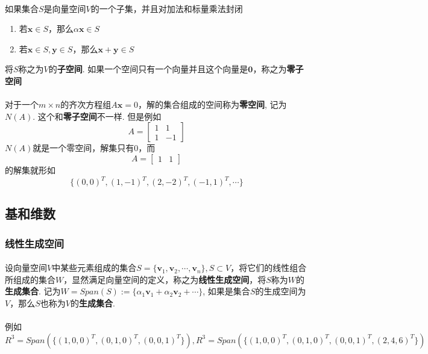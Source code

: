 \paragraph{}
如果集合$S$是向量空间$V$的一个子集，并且对加法和标量乘法封闭
\begin{enumerate}
\item 若$\textbf{x} \in S$，那么$\alpha \textbf{x} \in S$
\item 若$\textbf{x} \in S, \textbf{y} \in S$，那么$\textbf{x} + \textbf{y} \in S$
\end{enumerate}
将$S$称之为$V$的\textbf{子空间}. 如果一个空间只有一个向量并且这个向量是$\textbf{0}$，称之为\textbf{零子空间}

\paragraph{}
对于一个$m\times n$的齐次方程组$A\textbf{x} = 0$，解的集合组成的空间称为\textbf{零空间}, 记为$N(A)$.  这个和\textbf{零子空间}不一样. 但是例如
$$
A = \begin{bmatrix}
    1 & 1 \\
    1 & -1
  \end{bmatrix} 
$$
$N(A)$就是一个零空间，解集只有0，而
$$
A = \begin{bmatrix}
    1 & 1 
  \end{bmatrix} 
$$
的解集就形如
$$
\{(0, 0)^T, (1, -1)^T, (2, -2)^T, (-1, 1)^T, \cdots\}
$$

\subsection{基和维数}

\subsubsection{线性生成空间}
\paragraph{}
设向量空间$V$中某些元素组成的集合$S = \{\textbf{v}_1, \textbf{v}_2, \cdots, \textbf{v}_n\}, S \subset V$，将它们的线性组合所组成的集合$W$，显然满足向量空间的定义，称之为\textbf{线性生成空间}，将$S$称为$W$的\textbf{生成集合}. 记为$W = Span(S) := \{\alpha_1 \textbf{v}_1 + \alpha_2 \textbf{v}_2 + \cdots\}$, 如果是集合$S$的生成空间为$V$，那么$S$也称为$V$的\textbf{生成集合}.

\paragraph{}
例如
$$
R^3 = Span(\{ (1, 0, 0)^T, (0, 1, 0)^T, (0, 0, 1)^T \}), R^3 = Span(\{(1, 0, 0)^T, (0, 1, 0)^T, (0, 0, 1)^T, (2, 4, 6)^T\})
$$

